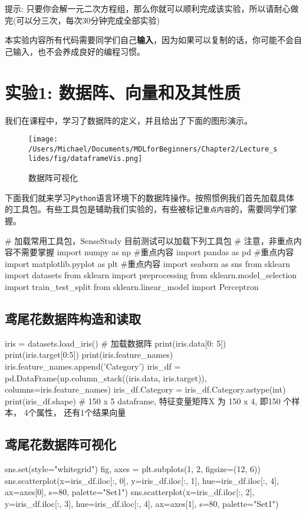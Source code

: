 \documentclass[11pt]{article}
\theoremstyle{definition}
\numberwithin{equation}{section}
\begin{document}
提示: 只要你会解一元二次方程组，那么你就可以顺利完成该实验，所以请耐心做完(可以分三次，每次30分钟完成全部实验)
\begin{tcolorbox}[title=代码不可复制!]
	本实验内容所有代码需要同学们自己\textbf{输入}，因为如果可以复制的话，你可能不会自己输入，也不会养成良好的编程习惯。
\end{tcolorbox}



\newpage

\section{实验1: 数据阵、向量和及其性质}

我们在课程中，学习了数据阵的定义，并且给出了下面的图形演示。
\begin{figure}[H]
	\centering
	\texttt{[image: /Users/Michael/Documents/MDLforBeginners/Chapter2/Lecture\_slides/fig/dataframeVis.png]}
	\caption{数据阵可视化}
\end{figure}
下面我们就来学习\texttt{Python}语言环境下的数据阵操作。按照惯例我们首先加载具体的工具包。有些工具包是辅助我们实验的，有些被标记\texttt{重点内容}的，需要同学们掌握。
\begin{python}
# 加载常用工具包，SenseStudy 目前测试可以加载下列工具包
# 注意，非重点内容不需要掌握
import numpy as np  #重点内容
import pandas as pd  #重点内容
import matplotlib.pyplot as plt  #重点内容
import seaborn as sns
from sklearn import datasets
from sklearn import preprocessing
from sklearn.model_selection import train_test_split
from sklearn.linear_model import Perceptron
\end{python}

\subsection{鸢尾花数据阵构造和读取}
\begin{python}
iris = datasets.load_iris()  # 加载数据阵
print(iris.data[0: 5])
print(iris.target[0:5])
print(iris.feature_names) 
iris.feature_names.append('Category')
iris_df = pd.DataFrame(np.column_stack((iris.data, iris.target)),
                       columns=iris.feature_names)
iris_df.Category = iris_df.Category.astype(int)
print(iris_df.shape)  # 150 x 5 dataframe, 特征变量矩阵X 为 150 x 4, 即150 个样本， 4个属性， 还有1个结果向量 
\end{python}


\subsection{鸢尾花数据阵可视化}
\begin{python}
sns.set(style="whitegrid")  
fig, axes = plt.subplots(1, 2, figsize=(12, 6))
sns.scatterplot(x=iris_df.iloc[:, 0],
                y=iris_df.iloc[:, 1],
                hue=iris_df.iloc[:, 4],
                ax=axes[0], s=80, palette="Set1")
sns.scatterplot(x=iris_df.iloc[:, 2],
                y=iris_df.iloc[:, 3],
                hue=iris_df.iloc[:, 4],
                ax=axes[1], s=80, palette="Set1")
\end{python}
\end{document}
